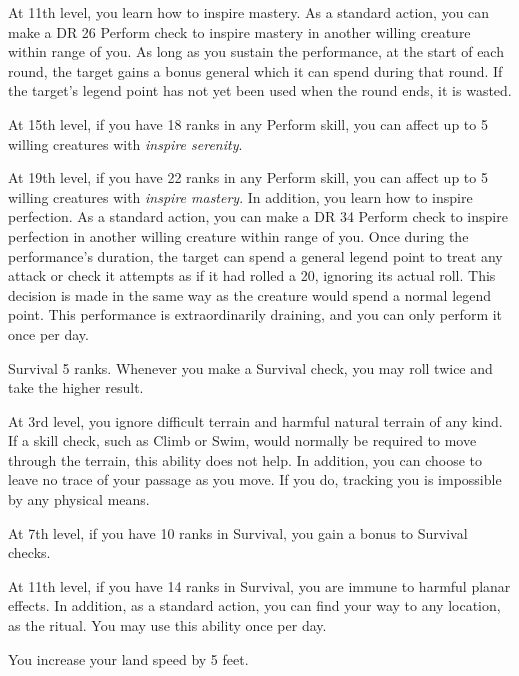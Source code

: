     At 11th level, you learn how to inspire mastery.
     As a standard action, you can make a DR 26 Perform check to inspire mastery in another willing creature within \rngmed range of you.
    As long as you sustain the performance, at the start of each round, the target gains a bonus general  which it can spend during that round.
    If the target's legend point has not yet been used when the round ends, it is wasted.

    At 15th level, if you have 18 ranks in any Perform skill, you can affect up to 5 willing creatures with \textit{inspire serenity}.

    At 19th level, if you have 22 ranks in any Perform skill, you can affect up to 5 willing creatures with \textit{inspire mastery}.
    In addition, you learn how to inspire perfection.
     As a standard action, you can make a DR 34 Perform check to inspire perfection in another willing creature within \rngmed range of you.
    Once during the performance's duration, the target can spend a general legend point to treat any attack or check it attempts as if it had rolled a 20, ignoring its actual roll.
    This decision is made in the same way as the creature would spend a normal legend point.
    This performance is extraordinarily draining, and you can only perform it once per day.

    \featpre Survival 5 ranks.
    \featben Whenever you make a Survival check, you may roll twice and take the higher result.

    At 3rd level, you ignore difficult terrain and harmful natural terrain of any kind.
    If a skill check, such as Climb or Swim, would normally be required to move through the terrain, this ability does not help.
    In addition, you can choose to leave no trace of your passage as you move.
    If you do, tracking you is impossible by any physical means.

    At 7th level, if you have 10 ranks in Survival, you gain a  bonus to Survival checks.

    At 11th level, if you have 14 ranks in Survival, you are immune to harmful planar effects.
    In addition, as a standard action, you can find your way to any location, as the  ritual.
    You may use this ability once per day.

    \featben You increase your land speed by 5 feet.

